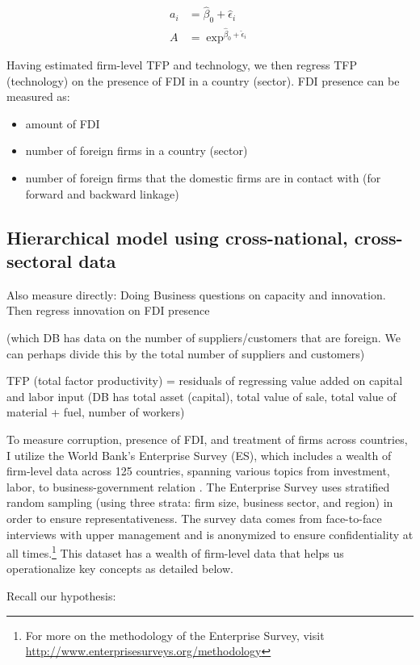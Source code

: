 \begin{align}
a_i &= \hat\beta_0 + \hat\epsilon_i \\
A &= \exp^{\hat\beta_0 + \hat\epsilon_i}
\end{align}

Having estimated firm-level TFP and technology, we then regress TFP (technology) on the presence of FDI in a country (sector). FDI presence can be measured as:
\begin{itemize}
\item amount of FDI
\item number of foreign firms in a country (sector)
\item number of foreign firms that the domestic firms are in contact with (for forward and backward linkage)
\end{itemize}

\subsection{Hierarchical model using cross-national, cross-sectoral data}

Also measure directly: Doing Business questions on capacity and innovation. Then regress innovation on FDI presence

(which DB has data on the number of suppliers/customers that are foreign. We can perhaps divide this by the total number of suppliers and customers)

TFP (total factor productivity) = residuals of regressing value added on capital and labor input (DB has total asset (capital), total value of sale, total value of material + fuel, number of workers)

To measure corruption, presence of FDI, and treatment of firms across countries, I utilize the World Bank's Enterprise Survey (ES), which includes a wealth of firm-level data across 125 countries, spanning various topics from investment, labor, to business-government relation \citep{WorldBank2015}. The Enterprise Survey uses stratified random sampling (using three strata: firm size, business sector, and region) in order to ensure representativeness. The survey data comes from face-to-face interviews with upper management and is anonymized to ensure confidentiality at all times.\footnote{For more on the methodology of the Enterprise Survey, visit \url{http://www.enterprisesurveys.org/methodology}} This dataset has a wealth of firm-level data that helps us operationalize key concepts as detailed below.

Recall our hypothesis:

